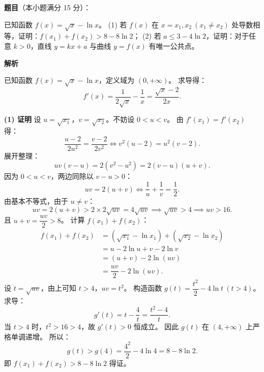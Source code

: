 \begin{answer}

\textbf{题目}（本小题满分 15 分）：

已知函数 $f(x) = \sqrt x - \ln x$。
(1) 若 $f(x)$ 在 $x = x_1, x_2\ (x_1 \neq x_2)$ 处导数相等，证明：$f(x_1) + f(x_2) > 8 - 8\ln 2$；
(2) 若 $a \leqslant 3 - 4\ln 2$，证明：对于任意 $k > 0$，直线 $y = kx + a$ 与曲线 $y = f(x)$ 有唯一公共点。

\textbf{解析}

已知函数 $f(x) = \sqrt x - \ln x$，定义域为 $(0, +\infty)$。
求导得：
\nopagebreak[4]
\[f'(x) = \dfrac{1}{2\sqrt x} - \dfrac{1}{x} = \dfrac{\sqrt x - 2}{2x}.\]

\textbf{(1) 证明} 设 $u = \sqrt{x_1}$，$v = \sqrt{x_2}$。不妨设 $0 < u < v$。
由 $f'(x_1) = f'(x_2)$ 得：
\nopagebreak[4]
\[\dfrac{u - 2}{2u^2} = \dfrac{v - 2}{2v^2} \iff v^2(u - 2) = u^2(v - 2).\]
展开整理：
\nopagebreak[4]
\[uv(v - u) = 2(v^2 - u^2) = 2(v - u)(u + v).\]
因为 $0 < u < v$，两边同除以 $v - u > 0$：
\nopagebreak[4]
\[uv = 2(u + v) \iff \dfrac{1}{u} + \dfrac{1}{v} = \dfrac12.\]
由基本不等式，由于 $u \neq v$：
\nopagebreak[4]
\[uv = 2(u + v) > 2 \times 2\sqrt{uv} = 4\sqrt{uv} \implies \sqrt{uv} > 4 \implies uv > 16.\]
且 $u + v = \dfrac{uv}{2} > 8$。
计算 $f(x_1) + f(x_2)$：
\nopagebreak[4]
\[\begin{aligned}
f(x_1) + f(x_2) &= (\sqrt{x_1} - \ln x_1) + (\sqrt{x_2} - \ln x_2) \\
&= u - 2\ln u + v - 2\ln v \\
&= (u + v) - 2\ln(uv) \\
&= \dfrac{uv}{2} - 2\ln(uv).
\end{aligned}\]
设 $t = \sqrt{uv}$，由上可知 $t > 4$，$uv = t^2$。
构造函数 $g(t) = \dfrac{t^2}{2} - 4\ln t\ (t > 4)$。
求导：
\nopagebreak[4]
\[g'(t) = t - \dfrac{4}{t} = \dfrac{t^2 - 4}{t}.\]
当 $t > 4$ 时，$t^2 > 16 > 4$，故 $g'(t) > 0$ 恒成立。
因此 $g(t)$ 在 $(4, +\infty)$ 上严格单调递增。
所以：
\nopagebreak[4]
\[g(t) > g(4) = \dfrac{4^2}{2} - 4\ln 4 = 8 - 8\ln 2.\]
即 $f(x_1) + f(x_2) > 8 - 8\ln 2$ 得证。


\end{answer}
